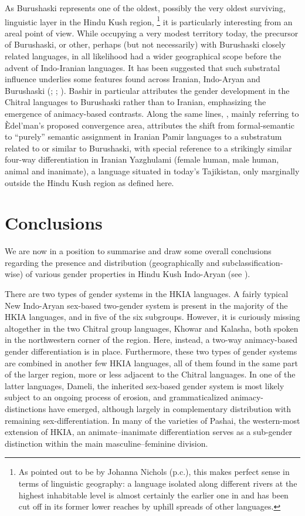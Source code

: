 \documentclass[output=collectionpaper]{langsci/langscibook}
\begin{document}
As Burushaski represents one of the oldest, possibly the very oldest surviving, linguistic layer in the Hindu Kush region,%
\footnote{%
As pointed out to be by Johanna Nichols (p.c.), this makes perfect sense in terms of linguistic geography: a language isolated along different rivers at the highest inhabitable level is almost certainly the earlier one in and has been cut off in its former lower reaches by uphill spreads of other languages.}  it is particularly interesting from an areal point of view. While occupying a very modest territory today, the precursor of Burushaski, or other, perhaps (but not necessarily) with Burushaski closely related languages, in all likelihood had a wider geographical scope before the advent of Indo-Iranian languages. It has been suggested that such substratal influence underlies some features found across Iranian, Indo-Aryan and Burushaski (\citealt{Tikkanen1988,Tikkanen1999}; \citealt[408--420]{Bashir1988}; \citealt{Edelman1980}). Bashir in particular attributes the gender development in the Chitral languages to Burushaski rather than to Iranian, emphasizing the emergence of animacy-based contrasts. Along the same lines, \citet[423]{Payne1989}, mainly referring to Èdel'man's proposed convergence area, attributes the shift from formal-semantic to ``purely'' semantic assignment in Iranian Pamir languages to a substratum related to or similar to Burushaski, with special reference to a strikingly similar four-way differentiation in Iranian Yazghulami (female human, male human, animal and inanimate), a language situated in today's Tajikistan, only marginally outside the Hindu Kush region as defined here.

\section{Conclusions}

We are now in a position to summarise and draw some overall conclusions regarding the presence and distribution (geographically and subclassification-wise) of various gender properties in Hindu Kush Indo-Aryan (see ).

There are two types of gender systems in the HKIA languages. A fairly typical New Indo-Aryan sex-based two-gender system is present in the majority of the HKIA languages, and in five of the six subgroups. However, it is curiously missing altogether in the two Chitral group languages, Khowar and Kalasha, both spoken in the northwestern corner of the region. Here, instead, a two-way animacy-based gender differentiation is in place. Furthermore, these two types of gender systems are combined in another few HKIA languages, all of them found in the same part of the larger region, more or less adjacent to the Chitral languages. In one of the latter languages, Dameli, the inherited sex-based gender system is most likely subject to an ongoing process of erosion, and grammaticalized animacy-distinctions have emerged, although largely in complementary distribution with remaining sex-differentiation. In many of the varieties of Pashai, the western-most extension of HKIA, an animate--inanimate differentiation serves as a sub-gender distinction within the main masculine--feminine division.
\end{document}
